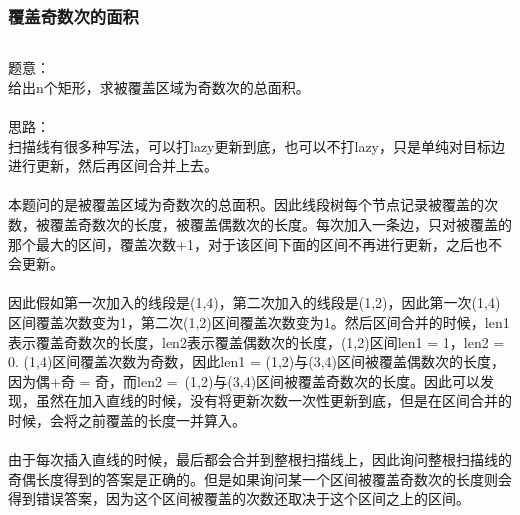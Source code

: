 \documentclass[twoside]{article}
\begin{document}
\subsubsection{覆盖奇数次的面积}
\begin{lstlisting}
\end{lstlisting}
题意：\\
给出n个矩形，求被覆盖区域为奇数次的总面积。\\
\\
思路：\\
扫描线有很多种写法，可以打lazy更新到底，也可以不打lazy，只是单纯对目标边进行更新，然后再区间合并上去。\\
\\
本题问的是被覆盖区域为奇数次的总面积。因此线段树每个节点记录被覆盖的次数，被覆盖奇数次的长度，被覆盖偶数次的长度。每次加入一条边，只对被覆盖的那个最大的区间，覆盖次数+1，对于该区间下面的区间不再进行更新，之后也不会更新。\\
\\
因此假如第一次加入的线段是(1,4)，第二次加入的线段是(1,2)，因此第一次(1,4)区间覆盖次数变为1，第二次(1,2)区间覆盖次数变为1。然后区间合并的时候，len1表示覆盖奇数次的长度，len2表示覆盖偶数次的长度，(1,2)区间len1 = 1，len2 = 0. (1,4)区间覆盖次数为奇数，因此len1 = (1,2)与(3,4)区间被覆盖偶数次的长度，因为偶+奇 = 奇，而len2 = (1,2)与(3,4)区间被覆盖奇数次的长度。因此可以发现，虽然在加入直线的时候，没有将更新次数一次性更新到底，但是在区间合并的时候，会将之前覆盖的长度一并算入。\\
\\
由于每次插入直线的时候，最后都会合并到整根扫描线上，因此询问整根扫描线的奇偶长度得到的答案是正确的。但是如果询问某一个区间被覆盖奇数次的长度则会得到错误答案，因为这个区间被覆盖的次数还取决于这个区间之上的区间。\\
\end{document}
